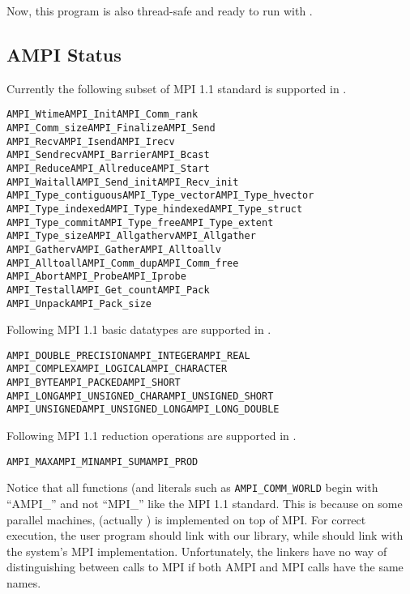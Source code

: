 \documentclass[10pt]{article}
\begin{document}
Now, this program is also thread-safe and ready to run with \ampi{}.  

\subsection{AMPI Status}

Currently the following subset of MPI 1.1 standard is supported in \ampi{}.

\begin{alltt}
  AMPI_Wtime           AMPI_Init          AMPI_Comm_rank       
  AMPI_Comm_size       AMPI_Finalize      AMPI_Send         
  AMPI_Recv            AMPI_Isend         AMPI_Irecv        
  AMPI_Sendrecv        AMPI_Barrier       AMPI_Bcast
  AMPI_Reduce          AMPI_Allreduce     AMPI_Start           
  AMPI_Waitall         AMPI_Send_init     AMPI_Recv_init    
  AMPI_Type_contiguous AMPI_Type_vector   AMPI_Type_hvector 
  AMPI_Type_indexed    AMPI_Type_hindexed AMPI_Type_struct
  AMPI_Type_commit     AMPI_Type_free     AMPI_Type_extent     
  AMPI_Type_size       AMPI_Allgatherv    AMPI_Allgather    
  AMPI_Gatherv         AMPI_Gather        AMPI_Alltoallv    
  AMPI_Alltoall        AMPI_Comm_dup      AMPI_Comm_free
  AMPI_Abort           AMPI_Probe         AMPI_Iprobe
  AMPI_Testall         AMPI_Get_count     AMPI_Pack
  AMPI_Unpack          AMPI_Pack_size
\end{alltt}

Following MPI 1.1 basic datatypes are supported in \ampi{}.

\begin{alltt}
AMPI_DOUBLE_PRECISION AMPI_INTEGER       AMPI_REAL          
AMPI_COMPLEX          AMPI_LOGICAL       AMPI_CHARACTER     
AMPI_BYTE             AMPI_PACKED        AMPI_SHORT            
AMPI_LONG             AMPI_UNSIGNED_CHAR AMPI_UNSIGNED_SHORT
AMPI_UNSIGNED         AMPI_UNSIGNED_LONG AMPI_LONG_DOUBLE
\end{alltt}

Following MPI 1.1 reduction operations are supported in \ampi{}.

\begin{alltt}
AMPI_MAX  AMPI_MIN  AMPI_SUM  AMPI_PROD
\end{alltt}

Notice that all \ampi{} functions (and literals such as
\texttt{AMPI\_COMM\_WORLD} begin with ``AMPI\_'' and not ``MPI\_'' like the MPI
1.1 standard. This is because on some parallel machines, \charmpp{} (actually
\converse{}) is implemented on top of MPI. For correct execution, the user
program should link with our \ampi{} library, while \charmpp{} should link with
the system's MPI implementation. Unfortunately, the linkers have no way of
distinguishing between calls to MPI if both AMPI and MPI calls have the same
names.
\end{document}
